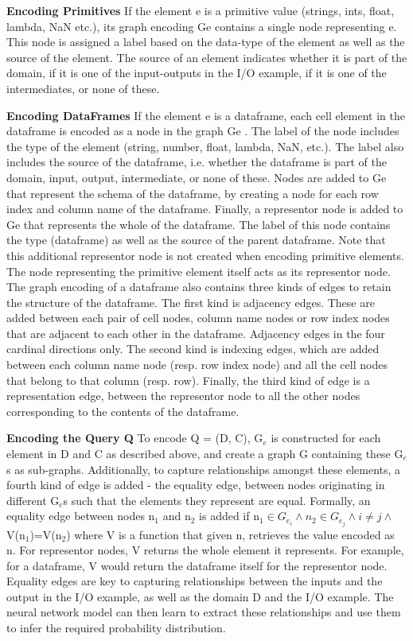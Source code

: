 \documentclass{article}
\begin{document}
\textbf{Encoding Primitives} If the element e is a primitive value (strings, ints, float, lambda, NaN etc.), its graph encoding Ge contains a single node representing e. This node is assigned a label based on the data-type of the element as well as the source of the element. The source of an element indicates whether it is part of the domain, if it is one of the input-outputs in the I/O example, if it is one of the intermediates, or none of these.

\textbf{Encoding DataFrames} If the element e is a dataframe, each cell element in the dataframe is encoded as a node in the graph Ge . The label of the node includes the type of the element (string, number, float, lambda, NaN, etc.). The label also includes the source of the dataframe, i.e. whether the dataframe is part of the domain, input, output, intermediate, or none of these. Nodes are added to Ge that represent the schema of the dataframe, by creating a node for each row index and column name of the dataframe. Finally, a representor node is added to Ge that represents the whole of the dataframe. The label of this node contains the type (dataframe) as well as the source of the parent dataframe. Note that this additional representor node is not created when encoding primitive elements. The node representing the primitive element itself acts as its representor node. The graph encoding of a dataframe also contains three kinds of edges to retain the structure of the dataframe. The first kind is adjacency edges. These are added between each pair of cell nodes, column name nodes or row index nodes that are adjacent to each other in the dataframe. Adjacency edges in the four cardinal directions only. The second kind is indexing edges, which are added between each column name node (resp. row index node) and all the cell nodes that belong to that column (resp. row). Finally, the third kind of edge is a representation edge, between the representor node to all the other nodes corresponding to the contents of the dataframe.

\textbf{Encoding the Query Q} To encode Q = (D, C), G$_e$ is constructed for each element in D and C as described above, and create a graph G containing these G$_e$ s as sub-graphs. Additionally, to capture relationships amongst these elements, a fourth kind of edge is added - the equality edge, between nodes originating in different G$_e$s such that the elements they represent are equal. Formally, an equality edge between nodes n$_1$ and n$_2$ is added if n$_1 \in G_{e_i} \wedge n_2 \in G_{e_j} \wedge i\neq j \wedge$V(n$_1$)=V(n$_2$) where V is a function that given n, retrieves the value encoded as n. For representor nodes, V returns the whole element it represents. For example, for a dataframe, V would return the dataframe itself for the representor node. Equality edges are key to capturing relationships between the inputs and the output in the I/O example, as well as the domain D and the I/O example. The neural network model can then learn to extract these relationships and use them to infer the required probability distribution.
\end{document}
